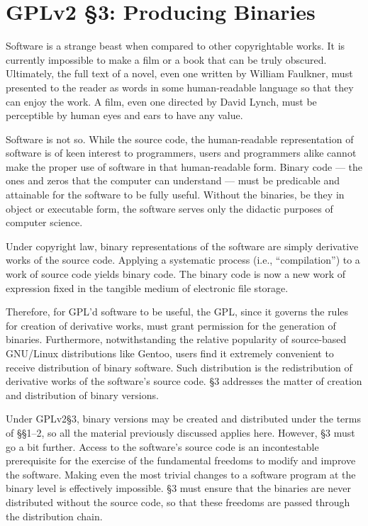 \section{GPLv2 \S 3: Producing Binaries}
\label{GPL-Section-3}

Software is a strange beast when compared to other copyrightable works.
It is currently impossible to make a film or a book that can be truly
obscured. Ultimately, the full text of a novel, even one written by
William Faulkner, must presented to the reader as words in some
human-readable language so that they can enjoy the work. A film, even one
directed by David Lynch, must be perceptible by human eyes and ears to
have any value.

Software is not so. While the source code, the human-readable
representation of software is of keen interest to programmers, users and
programmers alike cannot make the proper use of software in that
human-readable form. Binary code --- the ones and zeros that the computer
can understand --- must be predicable and attainable for the software to
be fully useful. Without the binaries, be they in object or executable
form, the software serves only the didactic purposes of computer science.

Under copyright law, binary representations of the software are simply
derivative works of the source code. Applying a systematic process (i.e.,
``compilation'') to a work of source code yields binary code. The binary
code is now a new work of expression fixed in the tangible medium of
electronic file storage.

Therefore, for GPL'd software to be useful, the GPL, since it governs the
rules for creation of derivative works, must grant permission for the
generation of binaries. Furthermore, notwithstanding the relative
popularity of source-based GNU/Linux distributions like Gentoo, users find
it extremely convenient to receive distribution of binary software. Such
distribution is the redistribution of derivative works of the software's
source code. \S 3 addresses the matter of creation and distribution of
binary versions.

Under GPLv2\S 3, binary versions may be created and distributed under the
terms of \S\S 1--2, so all the material previously discussed applies
here. However, \S 3 must go a bit further. Access to the software's
source code is an incontestable prerequisite for the exercise of the
fundamental freedoms to modify and improve the software. Making even
the most trivial changes to a software program at the binary level is
effectively impossible. \S 3 must ensure that the binaries are never
distributed without the source code, so that these freedoms are passed
through the distribution chain.

